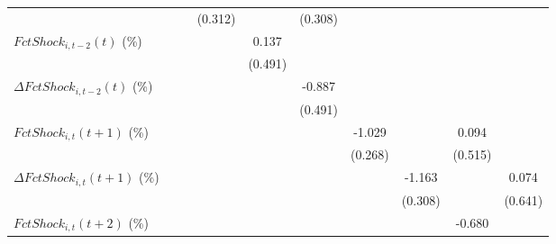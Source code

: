 {\begin{tabular}{l*{9}{c}}
                    &                     &                     &     (0.312)         &                     &     (0.308)         &                     &                     &                     &                     \\
\addlinespace
$ FctShock_{i,t-2}(t)$ (\%)&                     &                     &                     &       0.137         &                     &                     &                     &                     &                     \\
                    &                     &                     &                     &     (0.491)         &                     &                     &                     &                     &                     \\
\addlinespace
$ \Delta FctShock_{i,t-2}(t)$ (\%)&                     &                     &                     &                     &      -0.887\sym{*}  &                     &                     &                     &                     \\
                    &                     &                     &                     &                     &     (0.491)         &                     &                     &                     &                     \\
\addlinespace
$ FctShock_{i,t}(t+1)$ (\%)&                     &                     &                     &                     &                     &      -1.029\sym{***}&                     &       0.094         &                     \\
                    &                     &                     &                     &                     &                     &     (0.268)         &                     &     (0.515)         &                     \\
\addlinespace
$ \Delta FctShock_{i,t}(t+1)$ (\%)&                     &                     &                     &                     &                     &                     &      -1.163\sym{***}&                     &       0.074         \\
                    &                     &                     &                     &                     &                     &                     &     (0.308)         &                     &     (0.641)         \\
\addlinespace
$ FctShock_{i,t}(t+2)$ (\%)&                     &                     &                     &                     &                     &                     &                     &      -0.680         &                     \\

\end{tabular}}
